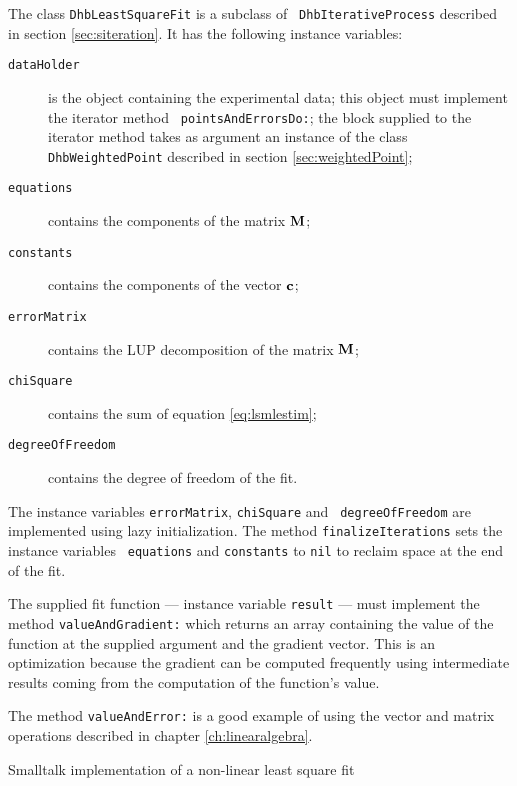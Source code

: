 \documentclass[twoside]{book}
\begin{document}
The class {\tt DhbLeastSquareFit} is a subclass of {\tt
DhbIterativeProcess} described in section \ref{sec:siteration}. It
has the following instance variables:
\begin{description}
  \item[\tt dataHolder] is the object containing the experimental
  data; this object must implement the iterator method {\tt
  pointsAndErrorsDo:}; the block supplied to the iterator method
  takes as argument an instance of the class {\tt
  DhbWeightedPoint} described in section \ref{sec:weightedPoint};
  \item[\tt equations] contains the components of the matrix ${\bf
  M}$;
  \item[\tt constants] contains the components of the vector ${\bf
  c}$;
  \item[\tt errorMatrix] contains the LUP decomposition of the matrix ${\bf
  M}$;
  \item[\tt chiSquare] contains the sum of equation \ref{eq:lsmlestim};
  \item[\tt degreeOfFreedom] contains the degree of freedom of the
  fit.
\end{description}
The instance variables {\tt errorMatrix}, {\tt chiSquare} and {\tt
degreeOfFreedom} are implemented using lazy initialization. The
method {\tt finalizeIterations} sets the instance variables {\tt
equations} and {\tt constants} to {\tt nil} to reclaim space at
the end of the fit.

The supplied fit function --- instance variable {\tt result} ---
must implement the method {\tt valueAndGradient:} which returns an
array containing the value of the function at the supplied
argument and the gradient vector. This is an optimization because
the gradient can be computed frequently using intermediate results
coming from the computation of the function's value.

The method {\tt valueAndError:} is a good example of using the
vector and matrix operations described in chapter
\ref{ch:linearalgebra}.

\begin{listing} Smalltalk implementation of a non-linear
least square fit \label{ls:lsfnonlin}

\end{listing}
\end{document}
